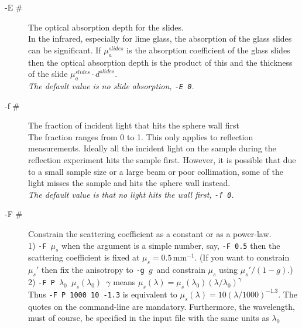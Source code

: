 \documentclass{article}
\begin{document}
\begin{description}
    \item[-E \#] The optical absorption depth for the slides.\\[1mm]
                 In the infrared, especially for lime glass, the absorption of the glass slides can be
                 significant.  If $\mu_a^{slides}$ is the absorption coefficient of the glass slides
                 then the optical absorption depth is the product of this and the thickness of the
                 slide $\mu_a^{slides}\cdot d^{slides}$.\\[1mm]
                 \textit{The default value is no slide absorption, \texttt{-E 0}.}

    \item[-f \#] The fraction of incident light that hits the sphere wall first\\[1mm]
                 The fraction ranges from 0 to 1.  This only applies to reflection measurements.  Ideally all the incident
                 light on the sample during the reflection experiment hits the sample first.  However,
                 it is possible that due to a small sample size or a large beam or poor collimation,
                 some of the light misses the sample and hits the sphere wall instead. \\[1mm]
                 \textit{The default value is that no light hits the wall first, \texttt{-f 0}.}
    
    \item[-F \#] Constrain the scattering coefficient as a constant or as a power-law.\\[1mm]
                 1) \texttt{-F $\mu_s$} when the argument is a simple number, say,
                 \texttt{-F 0.5} then the scattering coefficient is fixed at $\mu_s=0.5\,$mm$^{-1}$.
                 (If you want to constrain $\mu_s'$ then fix the anisotropy to \texttt{-g $g$}\
                 and constrain $\mu_s$ using $\mu_s'/(1-g)$.)\\[1mm]  
                 2) \texttt{-F \textquotesingle{}P $\lambda_0$ $\mu_s(\lambda_0)$ $\gamma$\textquotesingle}  means 
                 $\mu_s(\lambda)=\mu_s(\lambda_0) \left(\lambda/\lambda_0\right)^\gamma$\\
                 Thus \texttt{-F \textquotesingle{}P 1000 10 -1.3\textquotesingle}
                 is equivalent to $\mu_s(\lambda) = 10 (\lambda/1000)^{-1.3}$. The quotes on the command-line
                 are mandatory.  Furthermore, the wavelength, must of course,
                 be specified in the input file with the same units as $\lambda_0$


\end{description}
\end{document}

